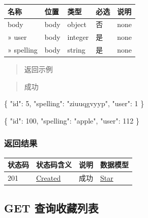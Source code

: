 \documentclass[
]{article}
\newenvironment{Shaded}{}{}
\newcommand{\DataTypeTok}[1]{\textcolor[rgb]{0.56,0.13,0.00}{#1}}
\newcommand{\DecValTok}[1]{\textcolor[rgb]{0.25,0.63,0.44}{#1}}
\newcommand{\FunctionTok}[1]{\textcolor[rgb]{0.02,0.16,0.49}{#1}}
\newcommand{\StringTok}[1]{\textcolor[rgb]{0.25,0.44,0.63}{#1}}
\begin{document}
\begin{longtable}[]{@{}lllll@{}}
\toprule
名称 & 位置 & 类型 & 必选 & 说明 \\
\midrule
\endhead
body & body & object & 否 & none \\
» user & body & integer & 是 & none \\
» spelling & body & string & 是 & none \\
\bottomrule
\end{longtable}

\begin{quote}
返回示例
\end{quote}

\begin{quote}
成功
\end{quote}

\begin{Shaded}
\begin{Highlighting}[]
\FunctionTok{\{}
  \DataTypeTok{"id"}\FunctionTok{:} \DecValTok{5}\FunctionTok{,}
  \DataTypeTok{"spelling"}\FunctionTok{:} \StringTok{"ziuuqgvyyp"}\FunctionTok{,}
  \DataTypeTok{"user"}\FunctionTok{:} \DecValTok{1}
\FunctionTok{\}}
\end{Highlighting}
\end{Shaded}

\begin{Shaded}
\begin{Highlighting}[]
\FunctionTok{\{}
  \DataTypeTok{"id"}\FunctionTok{:} \DecValTok{100}\FunctionTok{,}
  \DataTypeTok{"spelling"}\FunctionTok{:} \StringTok{"apple"}\FunctionTok{,}
  \DataTypeTok{"user"}\FunctionTok{:} \DecValTok{112}
\FunctionTok{\}}
\end{Highlighting}
\end{Shaded}

\hypertarget{ux8fd4ux56deux7ed3ux679c-32}{%
\subsubsection{返回结果}\label{ux8fd4ux56deux7ed3ux679c-32}}

\begin{longtable}[]{@{}llll@{}}
\toprule
状态码 & 状态码含义 & 说明 & 数据模型 \\
\midrule
\endhead
201 & \href{https://tools.ietf.org/html/rfc7231\#section-6.3.2}{Created}
& 成功 & \protect\hyperlink{schemastar}{Star} \\
\bottomrule
\end{longtable}

\hypertarget{get-ux67e5ux8be2ux6536ux85cfux5217ux8868-2}{%
\subsection{GET
查询收藏列表}\label{get-ux67e5ux8be2ux6536ux85cfux5217ux8868-2}}
\end{document}
